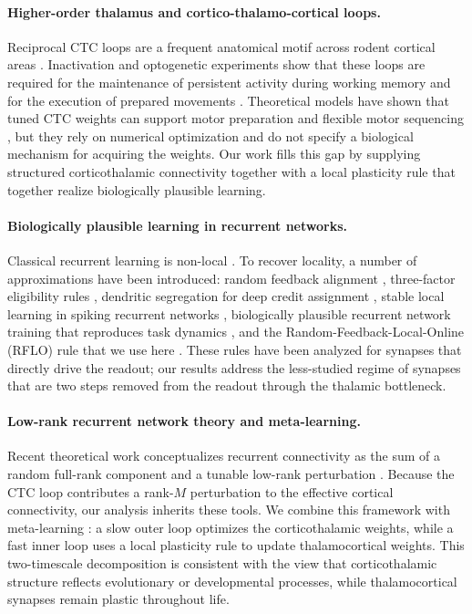 \documentclass[11pt]{article}
\begin{document}
\paragraph{Higher-order thalamus and cortico-thalamo-cortical loops.}
Reciprocal CTC loops are a frequent anatomical motif across rodent
cortical areas \cite{yamawaki2015synaptic, economo2018distinct,
collins2018reciprocal, guo2018anterolateral,
halassa2019thalamocortical}. Inactivation and optogenetic experiments
show that these loops are required for the maintenance of persistent
activity during working memory and for the execution of prepared
movements \cite{guo2017maintenance, bolkan2017thalamic, schmitt2017thalamic,
sauerbrei2020cortical, rikhye2018thalamic, alcaraz2018thalamocortical}.
Theoretical models have shown that tuned CTC weights can support motor
preparation and flexible motor sequencing \cite{kao2021optimal,
logiaco2021thalamic}, but they rely on numerical optimization and do
not specify a biological mechanism for acquiring the weights. Our work
fills this gap by supplying structured corticothalamic connectivity
together with a local plasticity rule that together realize
biologically plausible learning.

\paragraph{Biologically plausible learning in recurrent networks.}
Classical recurrent learning is non-local \cite{williams1989learning}.
To recover locality, a number of approximations have been introduced:
random feedback alignment \cite{lillicrap2016random}, three-factor
eligibility rules \cite{gerstner2018eligibility, bittner2017behavioral},
dendritic segregation for deep credit assignment
\cite{guerguiev2017towards}, stable local learning in spiking recurrent
networks \cite{gilra2017predicting}, biologically plausible recurrent
network training that reproduces task dynamics
\cite{miconi2017biologically}, and the Random-Feedback-Local-Online
(RFLO) rule that we use here \cite{murray2019local}. These rules have
been analyzed for synapses that directly drive the readout; our results
address the less-studied regime of synapses that are two steps removed
from the readout through the thalamic bottleneck.

\paragraph{Low-rank recurrent network theory and meta-learning.}
Recent theoretical work conceptualizes recurrent connectivity as the sum
of a random full-rank component and a tunable low-rank perturbation
\cite{mastrogiuseppe2018linking}. Because the CTC loop contributes a
rank-$M$ perturbation to the effective cortical connectivity, our
analysis inherits these tools. We combine this framework with
meta-learning \cite{wang2018prefrontal, hospedales2022meta}: a slow
outer loop optimizes the corticothalamic weights, while a fast inner
loop uses a local plasticity rule to update thalamocortical weights.
This two-timescale decomposition is consistent with the view that
corticothalamic structure reflects evolutionary or developmental
processes, while thalamocortical synapses remain plastic throughout
life.
\end{document}
